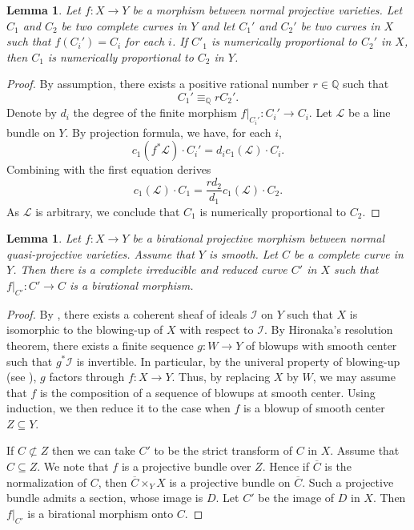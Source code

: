 \documentclass[english,reqno]{amsart}
\newcommand\bbQ{{\mathbb Q}}
\newcommand\sI{{\mathscr I}}
\newcommand\sL{{\mathscr L}}
\theoremstyle{plain}
\newtheorem{lemma}[thm]{Lemma}
\theoremstyle{definition}
\numberwithin{equation}{section} %
\begin{document}
\begin{lemma}
    \label{lemma:numerical-proportional-preseved}
    Let $f\colon X\rightarrow Y$ be a  morphism between normal projective varieties. Let $C_1$ and $C_2$ be two complete   curves in $Y$ and let $C_1'$ and $C_2'$ be two curves in $X$ such that $f(C_i')=C_i$ for each $i$. If $C'_1$ is numerically proportional to $C_2'$ in $X$, then $C_1$ is numerically proportional to $C_2$ in $Y$.
\end{lemma}

\begin{proof}
    By assumption, there exists a positive rational number $r\in \bbQ$ such that
    \begin{equation*}
    \label{equation:numerically-proportional}
    C_1'\equiv_{\bbQ} r C_2'.
    \end{equation*}
    Denote by $d_i$ the degree of the finite morphism $f\vert_{C_i'}\colon C_i'\rightarrow C_i$. Let $\sL$ be a line bundle  on $Y$. By projection formula, we have, for each $i$,
    \[
    c_1(f^*\sL)\cdot C_i'=d_i c_1(\sL)\cdot C_i.
    \]
    Combining with the first equation
    derives
    \[
    c_1(\sL)\cdot C_1=\frac{rd_2}{d_1}c_1(\sL)\cdot C_2.
    \]
    As $\sL$ is arbitrary, we conclude that $C_1$ is numerically proportional to $C_2$.
\end{proof}

\begin{lemma}
    \label{lemma:rational-section-birational-morphism}
    Let $f\colon X\rightarrow Y$ be a birational projective morphism  between normal quasi-projective varieties. Assume that $Y$ is smooth. Let $C$ be a complete curve in $Y$. Then there is a complete irreducible and reduced curve $C'$ in $X$ such that $f\vert_{C'}\colon C'\rightarrow C$ is a birational morphism.
\end{lemma}

\begin{proof}
    By \cite[II, Theorem 7.17]{Hartshorne1977}, there exists a coherent sheaf of ideals $\sI$ on $Y$ such that $X$ is isomorphic to the blowing-up of $X$ with respect to $\sI$. By Hironaka's resolution theorem, there exists a finite sequence $g\colon W\rightarrow Y$ of blowups with smooth center such that $g^*\sI$ is invertible. In particular, by the univeral property of blowing-up (see \cite[II, Proposition 7.14]{Hartshorne1977}), $g$ factors through $f\colon X\rightarrow Y$. Thus, by replacing $X$ by $W$, we may assume that $f$ is the composition of a sequence of blowups at smooth center. Using induction, we then reduce it to the case when $f$   is a blowup of smooth center $Z\subseteq Y$.

    If $C\not\subset Z$ then we can take $C'$ to be the strict transform of $C$ in $X$. Assume that $C\subseteq Z$. We note that $f$ is a projective bundle over $Z$. Hence if $\overline{C}$ is   the normalization of $C$, then $\overline{C}\times_Y X$ is a projective bundle  on $\overline{C}$.
    Such a projective bundle admits a   section, whose image is $D$. Let $C'$ be the image of $D$ in $X$. Then $f\vert_{C'}$ is a birational morphism onto $C$.
\end{proof}
\end{document}
